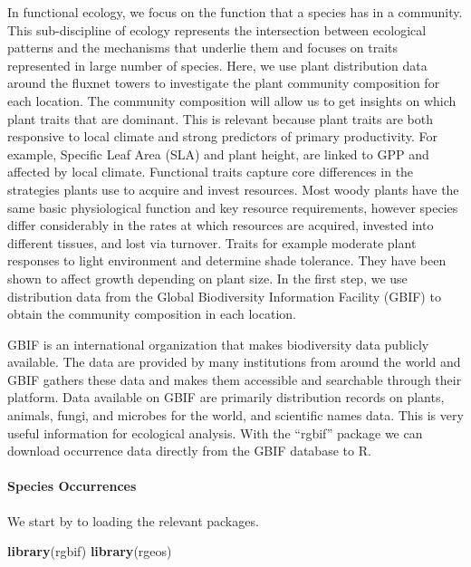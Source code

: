 \documentclass[
]{book}
\newenvironment{Shaded}{\begin{snugshade}}{\end{snugshade}}
\newcommand{\KeywordTok}[1]{\textcolor[rgb]{0.13,0.29,0.53}{\textbf{#1}}}
\newcommand{\NormalTok}[1]{#1}
\begin{document}
In functional ecology, we focus on the function that a species has in a community. This sub-discipline of ecology represents the intersection between ecological patterns and the mechanisms that underlie them and focuses on traits represented in large number of species. Here, we use plant distribution data around the fluxnet towers to investigate the plant community composition for each location. The community composition will allow us to get insights on which plant traits that are dominant. This is relevant because plant traits are both responsive to local climate and strong predictors of primary productivity. For example, Specific Leaf Area (SLA) and plant height, are linked to GPP and affected by local climate. Functional traits capture core differences in the strategies plants use to acquire and invest resources. Most woody plants have the same basic physiological function and key resource requirements, however species differ considerably in the rates at which resources are acquired, invested into different tissues, and lost via turnover. Traits for example moderate plant responses to light environment and determine shade tolerance. They have been shown to affect growth depending on plant size. In the first step, we use distribution data from the Global Biodiversity Information Facility (GBIF) to obtain the community composition in each location.

GBIF is an international organization that makes biodiversity data publicly available. The data are provided by many institutions from around the world and GBIF gathers these data and makes them accessible and searchable through their platform. Data available on GBIF are primarily distribution records on plants, animals, fungi, and microbes for the world, and scientific names data. This is very useful information for ecological analysis. With the ``rgbif'' package we can download occurrence data directly from the GBIF database to R.

\hypertarget{species-occurrences}{%
\paragraph{Species Occurrences}\label{species-occurrences}}

We start by to loading the relevant packages.

\begin{Shaded}
\begin{Highlighting}[]
\KeywordTok{library}\NormalTok{(rgbif)}
\KeywordTok{library}\NormalTok{(rgeos)}
\end{Highlighting}
\end{Shaded}
\end{document}
